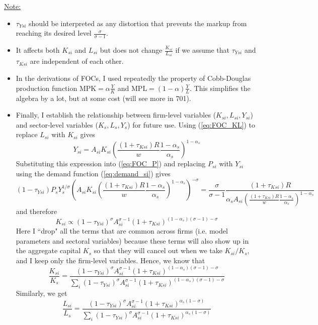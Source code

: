 \documentclass[12pt]{article}
\begin{document}
\underline{Note:} 
\begin{itemize}
		\item $\tau_{Ysi}$ should be interpreted as any distortion that prevents the markup from reaching its desired level $\frac{\sigma}{\sigma-1}$. 
		\item It affects both $K_{si}$ and $L_{si}$ but does not change $\frac{K_{si}}{L_{si}}$ if we assume that $\tau_{Ysi}$ and $\tau_{Ksi}$ are independent of each other.
	\item In the derivations of FOCs, I used repeatedly the property of Cobb-Douglas production function $\text{MPK} = \alpha \frac{Y}{K}$ and $\text{MPL} = (1-\alpha) \frac{Y}{L}$. This simplifies the algebra by a lot, but at some cost (will see more in 701).
		\item Finally, I establish the relationship between firm-level variables ($K_{si}, L_{si}, Y_{si}$) and sector-level variables ($K_s, L_s, Y_s$) for future use. Using (\ref{eq:FOC_KL}) to replace $L_{si}$ with $K_{si}$ gives
	\[Y_{si} = A_{si} K_{si} \left(\frac{(1+\tau_{Ksi})R}{w} \frac{1-\alpha_s}{\alpha_s}\right)^{1-\alpha_s}\]
	 Substituting this expression into (\ref{eq:FOC_P}) and replacing $P_{si}$ with $Y_{si}$ using the demand function (\ref{eq:demand_si}) gives
	\[(1-\tau_{Ysi}) P_s Y_s^{1/\sigma} \left(A_{si} K_{si}\left(\frac{(1+\tau_{Ksi})R}{w} \frac{1-\alpha_s}{\alpha_s}\right)^{1-\alpha_s}\right)^{-\sigma} = \frac{\sigma}{\sigma -1} \frac{(1+\tau_{Ksi}) R}{\alpha_s A_{si}\left(\frac{(1+\tau_{Ksi})R}{w} \frac{1-\alpha_s}{\alpha_s}\right)^{1-\alpha_s}}\]
	and therefore
	\[K_{si} \propto (1-\tau_{Ysi})^\sigma A_{si}^{\sigma -1} (1+\tau_{Ksi})^{(1-\alpha_s) (\sigma -1) - \sigma}\]
	Here I ``drop" all the terms that are common across firms (i.e. model parameters and sectoral variables) because these terms will also show up in the aggregate capital $K_s$ so that they will cancel out when we take $K_{si}/K_s$, and I keep only the firm-level variables. Hence, we know that
	\begin{equation}
		\frac{K_{si}}{K_s} = \frac{(1-\tau_{Ysi})^\sigma A_{si}^{\sigma -1} (1+\tau_{Ksi})^{(1-\alpha_s) (\sigma -1) - \sigma}}{\sum_i (1-\tau_{Ysi})^\sigma A_{si}^{\sigma -1} (1+\tau_{Ksi})^{(1-\alpha_s) (\sigma -1) - \sigma}}
	\end{equation} 
Similarly, we get
\begin{equation}
	\frac{L_{si}}{L_s} = \frac{(1-\tau_{Ysi})^\sigma A_{si}^{\sigma -1} (1+\tau_{Ksi})^{\alpha_s (1- \sigma)}}{\sum_i (1-\tau_{Ysi})^\sigma A_{si}^{\sigma -1} (1+\tau_{Ksi})^{\alpha_s (1- \sigma)}}

\end{equation}
\end{itemize}
\end{document}
